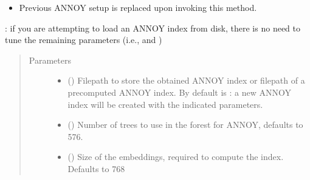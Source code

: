 \documentclass[letterpaper,10pt,english]{sphinxmanual}
\begin{document}
\begin{fulllineitems}
\begin{fulllineitems}
\begin{itemize}
\item {} 
Previous ANNOY setup is replaced upon invoking this method.

\end{itemize}

: if you are attempting to load an ANNOY index from disk, there
is no need to tune the remaining parameters (i.e.,  and 
)
\begin{quote}\begin{description}
\item[{Parameters}] \leavevmode\begin{itemize}
\item {} 
 (\sphinxstyleliteralemphasis{\sphinxupquote{, }}) \textendash{} Filepath to store the obtained ANNOY index or filepath
of a precomputed ANNOY index. By default is : a new ANNOY index will be
created with the indicated parameters.

\item {} 
 (\sphinxstyleliteralemphasis{\sphinxupquote{, }}) \textendash{} Number of trees to use in the forest for ANNOY, defaults to 576.

\item {} 
 (\sphinxstyleliteralemphasis{\sphinxupquote{, }}) \textendash{} Size of the embeddings, required to compute the index.
Defaults to 768

\end{itemize}

\end{description}\end{quote}

\end{fulllineitems}



\end{fulllineitems}
\end{document}

